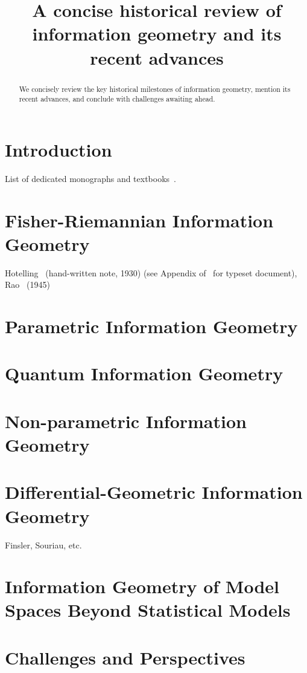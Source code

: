 \documentclass{article}
\title{A concise historical review of information geometry and its recent advances}
\author{}
\begin{document}
\maketitle

\begin{abstract}
We concisely review the key historical milestones of information geometry, mention its recent advances, and conclude with challenges awaiting ahead.
\end{abstract}


\section{Introduction}

List of dedicated monographs and textbooks~\cite{IG-2016,IG-2017}.

\section{Fisher-Riemannian Information Geometry}

Hotelling~\cite{Hotelling-1930} (hand-written note, 1930) (see Appendix of~\cite{EpicML-2007} for typeset document), Rao~\cite{Rao-1945,Rao-reprint-1992} (1945)

\section{Parametric Information Geometry}

\section{Quantum Information Geometry}

\section{Non-parametric Information Geometry}

\section{Differential-Geometric Information Geometry}

Finsler, Souriau, etc.



\section{Information Geometry of Model Spaces  Beyond Statistical Models}


\section{Challenges and Perspectives}



\end{document}
